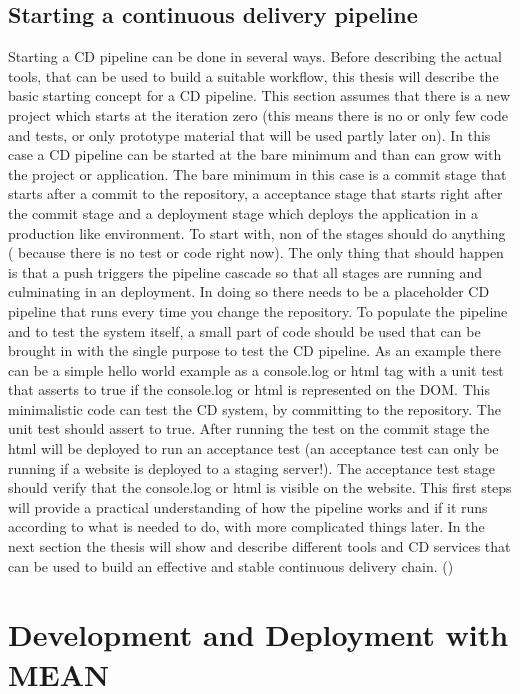 \subsection{Starting a continuous delivery pipeline}
Starting a CD pipeline can be done in several ways. Before describing the actual tools, that can be used to build a suitable workflow, this thesis will describe
the basic starting concept for a CD pipeline.
This section assumes that there is a new project which starts at the iteration zero (this means there is no or only few code and tests, or
only prototype material that will be used partly later on). In this case a CD pipeline can be started at the bare minimum and than can grow with the project
or application. The bare minimum in this case is a commit stage that starts after a commit to the repository, a acceptance stage that starts right after the
commit stage and a deployment stage which deploys the application in a production like environment. To start with, non of the stages should do anything (
because there is no test or code right now). The only thing that should happen is that a push triggers the pipeline cascade so that all stages are running
and culminating in an deployment. In doing so there needs to be a placeholder CD pipeline that runs every time you change the repository. To populate the pipeline
and to test the system itself, a small part of code should be used that can be brought in with the single purpose to test the CD pipeline. As an example there
can be a simple hello world example as a console.log or html tag with a unit test that asserts to true if the console.log or html is represented on the DOM.
This minimalistic code can test the CD system, by committing to the repository. The unit test should assert to true. After running the test on the commit stage the html
will be deployed to run an acceptance test (an acceptance test can only be running if a website is deployed to a staging server!). The acceptance test stage should
verify that the console.log or html is visible on the website. This first steps will provide a practical understanding of how the pipeline works and
if it runs according to what is needed to do, with more complicated things later. In the next section the thesis will show and describe different tools
and CD services that can be used to build an effective and stable continuous delivery chain. (\cite{humble2010continuous})


\section{Development and Deployment with MEAN}
\label{section:Development and Deployment with MEAN}

